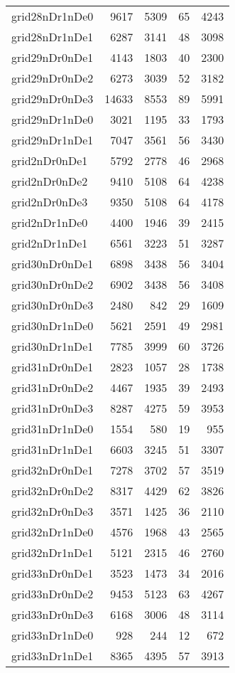 \documentclass[../../../thesis.tex]{subfiles}
\begin{document}
\begin{longtable}{lrrrr}
grid28nDr1nDe0 & 9617 & 5309 & 65 & 4243 \\
grid28nDr1nDe1 & 6287 & 3141 & 48 & 3098 \\
grid29nDr0nDe1 & 4143 & 1803 & 40 & 2300 \\
grid29nDr0nDe2 & 6273 & 3039 & 52 & 3182 \\
grid29nDr0nDe3 & 14633 & 8553 & 89 & 5991 \\
grid29nDr1nDe0 & 3021 & 1195 & 33 & 1793 \\
grid29nDr1nDe1 & 7047 & 3561 & 56 & 3430 \\
grid2nDr0nDe1 & 5792 & 2778 & 46 & 2968 \\
grid2nDr0nDe2 & 9410 & 5108 & 64 & 4238 \\
grid2nDr0nDe3 & 9350 & 5108 & 64 & 4178 \\
grid2nDr1nDe0 & 4400 & 1946 & 39 & 2415 \\
grid2nDr1nDe1 & 6561 & 3223 & 51 & 3287 \\
grid30nDr0nDe1 & 6898 & 3438 & 56 & 3404 \\
grid30nDr0nDe2 & 6902 & 3438 & 56 & 3408 \\
grid30nDr0nDe3 & 2480 & 842 & 29 & 1609 \\
grid30nDr1nDe0 & 5621 & 2591 & 49 & 2981 \\
grid30nDr1nDe1 & 7785 & 3999 & 60 & 3726 \\
grid31nDr0nDe1 & 2823 & 1057 & 28 & 1738 \\
grid31nDr0nDe2 & 4467 & 1935 & 39 & 2493 \\
grid31nDr0nDe3 & 8287 & 4275 & 59 & 3953 \\
grid31nDr1nDe0 & 1554 & 580 & 19 & 955 \\
grid31nDr1nDe1 & 6603 & 3245 & 51 & 3307 \\
grid32nDr0nDe1 & 7278 & 3702 & 57 & 3519 \\
grid32nDr0nDe2 & 8317 & 4429 & 62 & 3826 \\
grid32nDr0nDe3 & 3571 & 1425 & 36 & 2110 \\
grid32nDr1nDe0 & 4576 & 1968 & 43 & 2565 \\
grid32nDr1nDe1 & 5121 & 2315 & 46 & 2760 \\
grid33nDr0nDe1 & 3523 & 1473 & 34 & 2016 \\
grid33nDr0nDe2 & 9453 & 5123 & 63 & 4267 \\
grid33nDr0nDe3 & 6168 & 3006 & 48 & 3114 \\
grid33nDr1nDe0 & 928 & 244 & 12 & 672 \\
grid33nDr1nDe1 & 8365 & 4395 & 57 & 3913 \\

\end{longtable}
\end{document}
